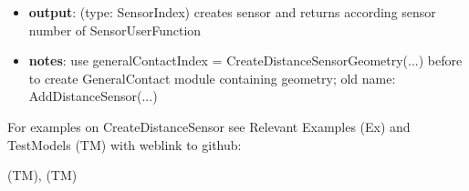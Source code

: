 \begin{itemize}[leftmargin=0.7cm]
\begin{itemize}[leftmargin=1.2cm]
\item[]{\it fileName}: if defined, recorded data of SensorUserFunction is written to specified file
\item[]{\it measureVelocity}: if True, the sensor measures additionally the velocity (component 0=distance, component 1=velocity); velocity is the velocity in direction 'dirSensor' and does not account for changes in geometry, thus it may be different from the time derivative of the distance!
\item[]{\it addGraphicsObject}: if True, the distance sensor is also visualized graphically in a simplified manner with a red line having the length of dirSensor; NOTE that updates are ONLY performed during computation, not in visualization; for this reason, solutionSettings.sensorsWritePeriod should be accordingly small
\item[]{\it drawDisplaced}: if True, the red line is drawn backwards such that it moves along the measured surface; if False, the beam is fixed to marker or position
\item[]{\it color}: optional color for 'laser beam' to be drawn
\end{itemize}
\item[--]
{\bf output}: (type: SensorIndex) creates sensor and returns according sensor number of SensorUserFunction
\item[--]
{\bf notes}: use generalContactIndex = CreateDistanceSensorGeometry(...) before to create GeneralContact module containing geometry; old name: AddDistanceSensor(...)
\vspace{12pt}\end{itemize}
%

%
\noindent For examples on CreateDistanceSensor see Relevant Examples (Ex) and TestModels (TM) with weblink to github:
\bi
 \item \footnotesize {} (TM), 
 (TM)
\ei

